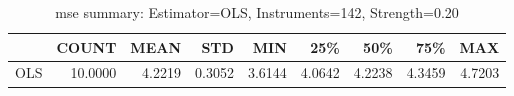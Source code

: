 \begin{table}[ht]
\centering
\caption{mse summary: Estimator=OLS, Instruments=142, Strength=0.20}
\begin{tabular}{lrrrrrrrr}
\toprule
 & COUNT & MEAN & STD & MIN & 25\% & 50\% & 75\% & MAX \\
\midrule
OLS & 10.0000 & 4.2219 & 0.3052 & 3.6144 & 4.0642 & 4.2238 & 4.3459 & 4.7203 \\
\bottomrule
\end{tabular}
\end{table}
